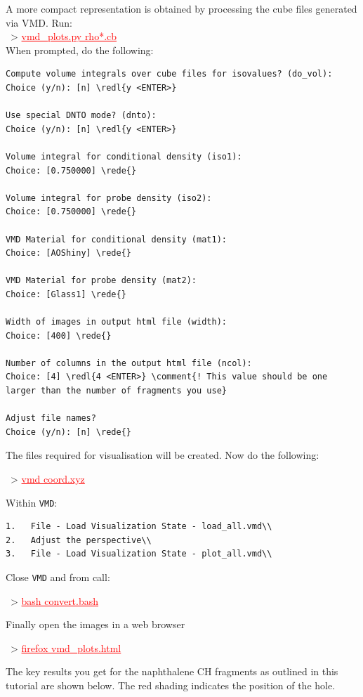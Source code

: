 \documentclass[DIV=12,headings=normal]{scrartcl}
\newcommand{\comment}[1]{\textcolor{blue}{#1}}
\newcommand{\redl}[1]{{\textcolor{red}{\underline{#1}}}}
\newcommand{\rede}[1]{\redl{#1 <ENTER>}}
\newcommand{\comm}[1]{
\small
~> \redl{#1}
\normalsize
}
\newcounter{number}
\begin{document}
A more compact representation is obtained by processing the cube files generated via VMD. Run:\\
\comm{vmd\_plots.py rho*.cb}\\
When prompted, do the following:
\scriptsize
\begin{Verbatim}[commandchars=\\\{\}]
Compute volume integrals over cube files for isovalues? (do_vol):
Choice (y/n): [n] \redl{y <ENTER>}

Use special DNTO mode? (dnto):
Choice (y/n): [n] \redl{y <ENTER>}

Volume integral for conditional density (iso1):
Choice: [0.750000] \rede{}

Volume integral for probe density (iso2):
Choice: [0.750000] \rede{}

VMD Material for conditional density (mat1):
Choice: [AOShiny] \rede{}

VMD Material for probe density (mat2):
Choice: [Glass1] \rede{}

Width of images in output html file (width):
Choice: [400] \rede{}

Number of columns in the output html file (ncol):
Choice: [4] \redl{4 <ENTER>} \comment{! This value should be one larger than the number of fragments you use}

Adjust file names?
Choice (y/n): [n] \rede{}
\end{Verbatim}
\normalsize

The files required for visualisation will be created. Now do the following:

\comm{vmd coord.xyz}

Within \texttt{VMD}:
\scriptsize
\begin{Verbatim}[commandchars=\\\{\}]
1.   File - Load Visualization State - load_all.vmd\\
2.   Adjust the perspective\\
3.   File - Load Visualization State - plot_all.vmd\\
\end{Verbatim}
\normalsize

Close \texttt{VMD} and from call:
\comm{bash convert.bash}

Finally open the images in a web browser 
\comm{firefox vmd\_plots.html}

The key results you get for the naphthalene CH fragments as outlined in this tutorial are shown below. The red shading indicates the position of the hole. 
\end{document}

